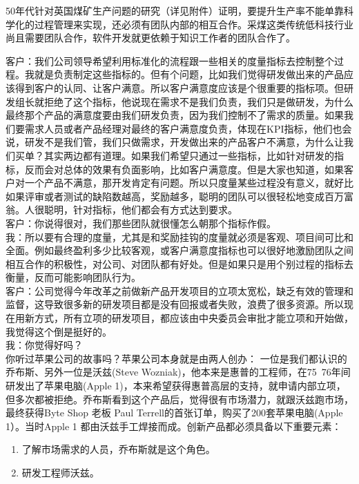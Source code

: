 50年代针对英国煤矿生产问题的研究（详见附件）证明，要提升生产率不能单靠科学化的过程管理来实现，还必须有团队内部的相互合作。采煤这类传统低科技行业尚且需要团队合作，软件开发就更依赖于知识工作者的团队合作了。

客户：我们公司领导希望利用标准化的流程跟一些相关的度量指标去控制整个过程。我就是负责制定这些指标的。但有个问题，比如我们觉得研发做出来的产品应该得到客户的认同、让客户满意。所以客户满意度应该是个很重要的指标项。但研发组长就拒绝了这个指标，他说现在需求不是我们负责，我们只是做研发，为什么最终那个产品的满意度要由我们研发负责，因为我们控制不了需求的质量。如果我们要需求人员或者产品经理对最终的客户满意度负责，体现在KPI指标，他们也会说，研发不是我们管，我们只做需求，开发做出来的产品客户不满意，为什么让我们买单？其实两边都有道理。如果我们希望只通过一些指标，比如针对研发的指标，反而会对总体的效果有负面影响，比如客户满意度。但是大家也知道，如果客户对一个产品不满意，那开发肯定有问题。所以只度量某些过程没有意义，就好比如果评审或者测试的缺陷数越高，奖励越多，聪明的团队可以很轻松地变成百万富翁。人很聪明，针对指标，他们都会有方式达到要求。\\
客户：你说得很对，我们那些团队就很懂怎么朝那个指标作假。\\
我：所以要有合理的度量，尤其是和奖励挂钩的度量就必须是客观、项目间可比和全面。例如最终盈利多少比较客观，或客户满意度指标也可以很好地激励团队之间相互合作的积极性，对公司、对团队都有好处。但是如果只是用个别过程的指标去衡量，反而可能影响团队行为。\\
客户：公司觉得今年改革之前做新产品开发项目的立项太宽松，缺乏有效的管理和监督，这导致很多新的研发项目都是没有回报或者失败，浪费了很多资源。所以现在用新方式，所有立项的研发项目，都应该由中央委员会审批才能立项和开始做，我觉得这个倒是挺好的。\\
我：你觉得好吗？\\
你听过苹果公司的故事吗？苹果公司本身就是由两人创办：
一位是我们都认识的乔布斯、另外一位是沃兹(Steve
Wozniak)，他本来是惠普的工程师，在75~76年间研发出了苹果电脑(Apple
1)，本来希望获得惠普高层的支持，就申请内部立项，但多次都被拒绝。乔布斯看到这个产品后，觉得很有市场潜力，就跟沃兹跑市场，最终获得Byte
Shop 老板 Paul Terrell的首张订单，购买了200套苹果电脑(Apple
1）。当时Apple 1 都由沃兹手工焊接而成。创新产品都必须具备以下重要元素：

\begin{enumerate}
\tightlist
\item
  了解市场需求的人员，乔布斯就是这个角色。
\item
  研发工程师沃兹。
\end{enumerate}


